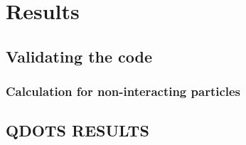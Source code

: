 \chapter{Results}


\section{Validating the code}


\subsection{Calculation for non-interacting particles}

\section{QDOTS RESULTS}


